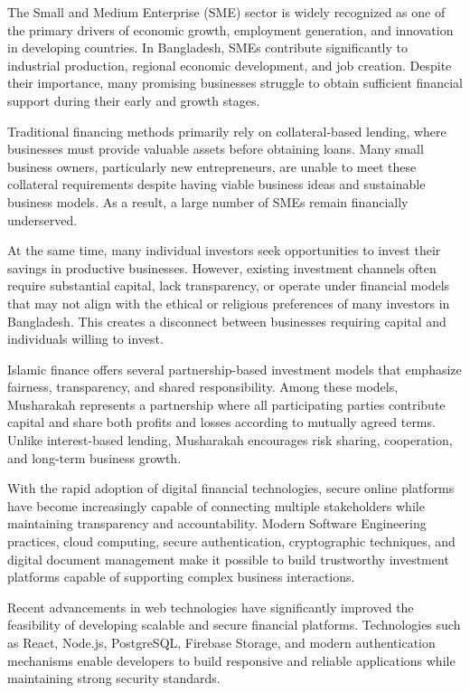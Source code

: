 The Small and Medium Enterprise (SME) sector is widely recognized as one of the primary drivers of economic growth, employment generation, and innovation in developing countries. In Bangladesh, SMEs contribute significantly to industrial production, regional economic development, and job creation. Despite their importance, many promising businesses struggle to obtain sufficient financial support during their early and growth stages.

Traditional financing methods primarily rely on collateral-based lending, where businesses must provide valuable assets before obtaining loans. Many small business owners, particularly new entrepreneurs, are unable to meet these collateral requirements despite having viable business ideas and sustainable business models. As a result, a large number of SMEs remain financially underserved.

At the same time, many individual investors seek opportunities to invest their savings in productive businesses. However, existing investment channels often require substantial capital, lack transparency, or operate under financial models that may not align with the ethical or religious preferences of many investors in Bangladesh. This creates a disconnect between businesses requiring capital and individuals willing to invest.

Islamic finance offers several partnership-based investment models that emphasize fairness, transparency, and shared responsibility. Among these models, Musharakah represents a partnership where all participating parties contribute capital and share both profits and losses according to mutually agreed terms. Unlike interest-based lending, Musharakah encourages risk sharing, cooperation, and long-term business growth.

With the rapid adoption of digital financial technologies, secure online platforms have become increasingly capable of connecting multiple stakeholders while maintaining transparency and accountability. Modern Software Engineering practices, cloud computing, secure authentication, cryptographic techniques, and digital document management make it possible to build trustworthy investment platforms capable of supporting complex business interactions.

Recent advancements in web technologies have significantly improved the feasibility of developing scalable and secure financial platforms. Technologies such as React, Node.js, PostgreSQL, Firebase Storage, and modern authentication mechanisms enable developers to build responsive and reliable applications while maintaining strong security standards.

